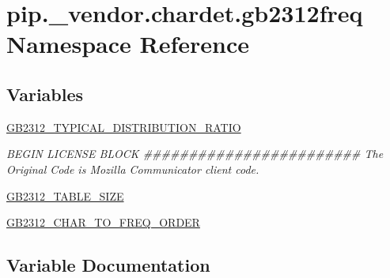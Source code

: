 \hypertarget{namespacepip_1_1__vendor_1_1chardet_1_1gb2312freq}{}\section{pip.\+\_\+vendor.\+chardet.\+gb2312freq Namespace Reference}
\label{namespacepip_1_1__vendor_1_1chardet_1_1gb2312freq}
\subsection*{Variables}
\begin{DoxyCompactItemize}
\item 
\hyperlink{namespacepip_1_1__vendor_1_1chardet_1_1gb2312freq_a2a73bc3dc01cf54aa8d13987d4bbd8ad}{G\+B2312\+\_\+\+T\+Y\+P\+I\+C\+A\+L\+\_\+\+D\+I\+S\+T\+R\+I\+B\+U\+T\+I\+O\+N\+\_\+\+R\+A\+T\+IO}
\begin{DoxyCompactList}\small\item\em B\+E\+G\+IN L\+I\+C\+E\+N\+SE B\+L\+O\+CK \#\#\#\#\#\#\#\#\#\#\#\#\#\#\#\#\#\#\#\#\#\#\#\# The Original Code is Mozilla Communicator client code. \end{DoxyCompactList}\item 
\hyperlink{namespacepip_1_1__vendor_1_1chardet_1_1gb2312freq_a357164e4e9821b062d4ed6993fb36457}{G\+B2312\+\_\+\+T\+A\+B\+L\+E\+\_\+\+S\+I\+ZE}
\item 
\hyperlink{namespacepip_1_1__vendor_1_1chardet_1_1gb2312freq_ac4ca39d2e93206174560ff8435df1d4c}{G\+B2312\+\_\+\+C\+H\+A\+R\+\_\+\+T\+O\+\_\+\+F\+R\+E\+Q\+\_\+\+O\+R\+D\+ER}
\end{DoxyCompactItemize}


\subsection{Variable Documentation}
\mbox{\label{namespacepip_1_1__vendor_1_1chardet_1_1gb2312freq_ac4ca39d2e93206174560ff8435df1d4c}} 
